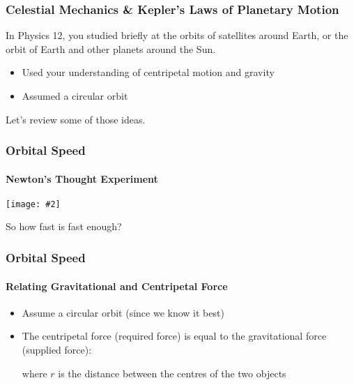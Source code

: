 \documentclass[12pt,compress,aspectratio=169]{beamer}
\newcommand{\pic}[2]{\texttt{[image: \#2]}}
\begin{document}
\begin{frame}
  \frametitle{Celestial Mechanics \& Kepler's Laws of Planetary Motion}
  In Physics 12, you studied briefly at the orbits of satellites around Earth,
  or the orbit of Earth and other planets around the Sun.
  \begin{itemize}
  \item Used your understanding of centripetal motion and gravity
  \item Assumed a circular orbit
  \end{itemize}
  Let's review some of those ideas.
\end{frame}


\begin{frame}
  \frametitle{Orbital Speed}
  \framesubtitle{Newton's Thought Experiment}
  \begin{center}
    \pic{1}{figure-5.jpg}
  \end{center}

  \vspace{-.3in}So how fast is fast enough?
\end{frame}


\begin{frame}
  \frametitle{Orbital Speed}
  \framesubtitle{Relating Gravitational and Centripetal Force}
  \begin{itemize}
  \item Assume a circular orbit (since we know it best)
  \item The centripetal force (required force) is equal to the gravitational
    force (supplied force):

    where $r$ is the distance between the centres of the two objects
  \end{itemize}
\end{frame}
\end{document}
